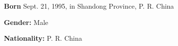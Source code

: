 \textbf{Born} Sept. 21, 1995, in Shandong Province, P. R. China

\textbf{Gender:} Male

\textbf{Nationality:} P. R. China

